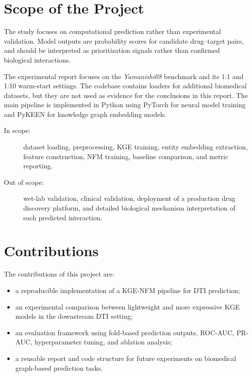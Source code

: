\section{Scope of the Project}

The study focuses on computational prediction rather than experimental
validation. Model outputs are probability scores for candidate drug--target
pairs, and should be interpreted as prioritization signals rather than
confirmed biological interactions.

The experimental report focuses on the \textit{Yamanishi08} benchmark and its
1:1 and 1:10 warm-start settings. The codebase contains loaders for additional
biomedical datasets, but they are not used as evidence for the conclusions in
this report. The main pipeline is implemented in Python using PyTorch for
neural model training and PyKEEN for knowledge graph embedding models.

\begin{description}
    \item[In scope:] dataset loading, preprocessing, KGE training, entity
    embedding extraction, feature construction, NFM training, baseline
    comparison, and metric reporting.

    \item[Out of scope:] wet-lab validation, clinical validation, deployment of
    a production drug discovery platform, and detailed biological mechanism
    interpretation of each predicted interaction.
\end{description}

\section{Contributions}

The contributions of this project are:

\begin{itemize}
    \item a reproducible implementation of a KGE-NFM pipeline for DTI prediction;

    \item an experimental comparison between lightweight and more expressive KGE
    models in the downstream DTI setting;

    \item an evaluation framework using fold-based prediction outputs,
    ROC-AUC, PR-AUC, hyperparameter tuning, and ablation analysis;

    \item a reusable report and code structure for future experiments on
    biomedical graph-based prediction tasks.
\end{itemize}

